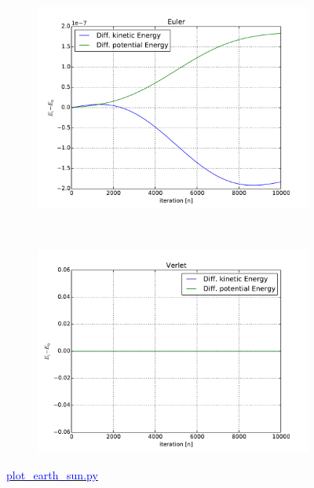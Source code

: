 \begin{figure}[H]
    \centering
    \begin{subfigure}{0.5\textwidth}
        \centering
        \includegraphics[width=\linewidth]{result/bilder/kin-pot-euler.pdf}
    	\caption{}
    \end{subfigure}%
    ~ 
    \begin{subfigure}{0.5\textwidth}
        \centering
        \includegraphics[width=\linewidth]{result/bilder/kin-pot-verlet.pdf}
        \caption{}
    \end{subfigure}
    \caption{\href{https://github.com/erikfsk/Project-3/blob/master/Project3/3a/plot_earth_sun.py}{\textcolor{blue}{plot\_earth\_sun.py}}}
    \label{fig:conserved-energy}
\end{figure}


